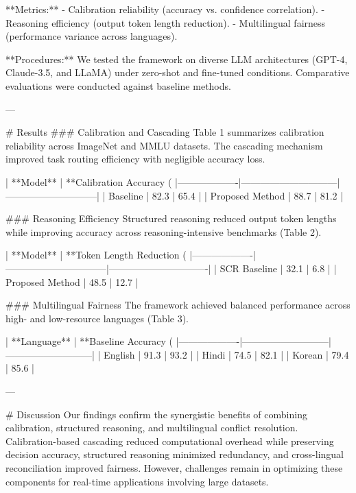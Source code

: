 **Metrics:**  
- Calibration reliability (accuracy vs. confidence correlation).  
- Reasoning efficiency (output token length reduction).  
- Multilingual fairness (performance variance across languages).  

**Procedures:**  
We tested the framework on diverse LLM architectures (GPT-4, Claude-3.5, and LLaMA) under zero-shot and fine-tuned conditions. Comparative evaluations were conducted against baseline methods.

---

# Results  
### Calibration and Cascading  
Table 1 summarizes calibration reliability across ImageNet and MMLU datasets. The cascading mechanism improved task routing efficiency with negligible accuracy loss.  

| **Model**        | **Calibration Accuracy (%
|-------------------|------------------------------|-----------------------------|  
| Baseline          | 82.3                        | 65.4                        |  
| Proposed Method   | 88.7                        | 81.2                        |  

### Reasoning Efficiency  
Structured reasoning reduced output token lengths while improving accuracy across reasoning-intensive benchmarks (Table 2).  

| **Model**        | **Token Length Reduction (%
|-------------------|--------------------------------|-------------------------------|  
| SCR Baseline      | 32.1                          | 6.8                           |  
| Proposed Method   | 48.5                          | 12.7                          |  

### Multilingual Fairness  
The framework achieved balanced performance across high- and low-resource languages (Table 3).  

| **Language**      | **Baseline Accuracy (%
|-------------------|---------------------------|---------------------------|  
| English           | 91.3                     | 93.2                     |  
| Hindi             | 74.5                     | 82.1                     |  
| Korean            | 79.4                     | 85.6                     |  

---

# Discussion  
Our findings confirm the synergistic benefits of combining calibration, structured reasoning, and multilingual conflict resolution. Calibration-based cascading reduced computational overhead while preserving decision accuracy, structured reasoning minimized redundancy, and cross-lingual reconciliation improved fairness. However, challenges remain in optimizing these components for real-time applications involving large datasets.


